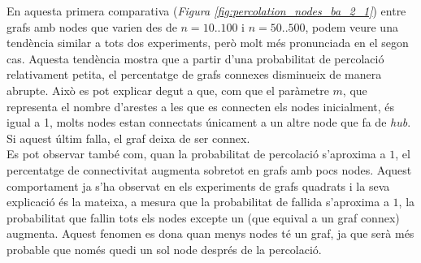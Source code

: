 \documentclass[a4paper]{article}
\begin{document}
	En aquesta primera comparativa (\textit{Figura \ref{fig:percolation_nodes_ba_2_1}}) entre grafs amb nodes que varien des de $n = 10..100$ i $n = 50..500$, podem veure una tendència similar a tots dos experiments, però molt més pronunciada en el segon cas. Aquesta tendència mostra que a partir d'una probabilitat de percolació relativament petita, el percentatge de grafs connexes disminueix de manera abrupte. Això es pot explicar degut a que, com que el paràmetre $m$, que representa el nombre d'arestes a les que es connecten els nodes inicialment, és igual a 1, molts nodes estan connectats únicament a un altre node que fa de \textit{hub}. Si aquest últim falla, el graf deixa de ser connex. \\
	
	Es pot observar també com, quan la probabilitat de percolació s'aproxima a $1$, el percentatge de connectivitat augmenta sobretot en grafs amb pocs nodes. Aquest comportament ja s'ha observat en els experiments de grafs quadrats i la seva explicació és la mateixa, a mesura que la probabilitat de fallida s'aproxima a $1$, la probabilitat que fallin tots els nodes excepte un (que equival a un graf connex) augmenta. Aquest fenomen es dona quan menys nodes té un graf, ja que serà més probable que només quedi un sol node després de la percolació. \\
	
\end{document}
